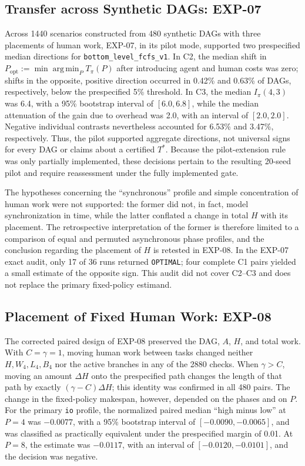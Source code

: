 \subsection{Transfer across Synthetic DAGs: EXP-07}

Across 1440 scenarios constructed from 480 synthetic DAGs with three placements
of human work, EXP-07, in its pilot mode, supported two prespecified median
directions for \texttt{bottom\_level\_fcfs\_v1}. In C2, the median shift in
$P_{\mathrm{opt}}:=\min\operatorname*{arg\,min}_{P}T_\pi(P)$ after introducing
agent and human costs was zero; shifts in the opposite, positive direction
occurred in 0.42\% and 0.63\% of DAGs, respectively, below the prespecified
5\% threshold. In C3, the median $I_\pi(4,3)$ was 6.4, with a 95\% bootstrap
interval of $[6.0,6.8]$, while the median attenuation of the gain due to overhead
was 2.0, with an interval of $[2.0,2.0]$. Negative individual contrasts
nevertheless accounted for 6.53\% and 3.47\%, respectively. Thus, the pilot
supported aggregate directions, not universal signs for every DAG or claims
about a certified $T^*$. Because the pilot-extension rule was only partially
implemented, these decisions pertain to the resulting 20-seed pilot and require
reassessment under the fully implemented gate.

The hypotheses concerning the ``synchronous'' profile and simple concentration
of human work were not supported: the former did not, in fact, model
synchronization in time, while the latter conflated a change in total $H$ with
its placement. The retrospective interpretation of the former is therefore
limited to a comparison of equal and permuted asynchronous phase profiles, and
the conclusion regarding the placement of $H$ is retested in EXP-08. In the
EXP-07 exact audit, only 17 of 36 runs returned \texttt{OPTIMAL}; four complete
C1 pairs yielded a small estimate of the opposite sign. This audit did not
cover C2--C3 and does not replace the primary fixed-policy estimand.

\subsection{Placement of Fixed Human Work: EXP-08}

The corrected paired design of EXP-08 preserved the DAG, $A$, $H$, and total
work. With $C=\gamma=1$, moving human work between tasks changed neither
$H,W_4,L_4,B_4$ nor the active branches in any of the 2880 checks. When
$\gamma>C$, moving an amount $\Delta H$ onto the prespecified path changes the
length of that path by exactly $(\gamma-C)\Delta H$; this identity was confirmed
in all 480 pairs. The change in the fixed-policy makespan, however,
depended on the phases and on $P$. For the primary \texttt{io} profile, the
normalized paired median ``high minus low'' at $P=4$ was $-0.0077$, with a 95\%
bootstrap interval of $[-0.0090,-0.0065]$, and was classified as practically
equivalent under the prespecified margin of 0.01. At $P=8$, the estimate was
$-0.0117$, with an interval of $[-0.0120,-0.0101]$, and the decision was
negative.

